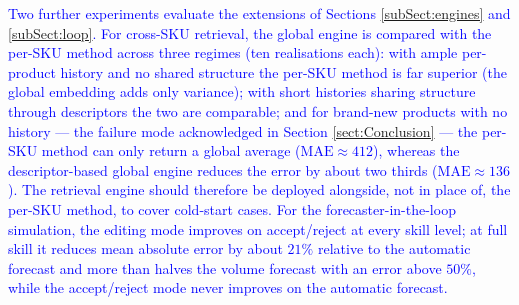 \documentclass{ieeeaccess}
\newcommand{\myblue}[1]{\textcolor{blue}{#1}}
\begin{document}
\begin{table}[t]
\centering
{}
\caption{\myblue{Ablation on the surrogate model of Section
\ref{subSect:muticol} (mean over the ideal, collinearity and endogeneity
scenarios, five realisations). Correcting the selection of $k$ alone removes a
large fraction of the error, and the metric-learning engines improve on it
further. The uniform-weight row isolates the contribution of metric learning.}}
\label{tab:revisedAblation}
\end{table}

\myblue{Two further experiments evaluate the extensions of
Sections \ref{subSect:engines} and \ref{subSect:loop}. For cross-SKU
retrieval, the global engine is compared with the per-SKU method across three
regimes (ten realisations each): with ample per-product history and no shared
structure the per-SKU method is far superior (the global embedding adds only
variance); with short histories sharing structure through descriptors the two
are comparable; and for brand-new products with no history --- the failure mode
acknowledged in Section \ref{sect:Conclusion} --- the per-SKU method can only
return a global average ($\mathrm{MAE}\approx412$), whereas the descriptor-based
global engine reduces the error by about two thirds ($\mathrm{MAE}\approx136$).
The retrieval engine should therefore be deployed alongside, not in place of,
the per-SKU method, to cover cold-start cases. For the forecaster-in-the-loop
simulation, the editing mode improves on accept/reject at every skill level; at
full skill it reduces mean absolute error by about $21\%$ relative to the
automatic forecast and more than halves the volume forecast with an error above
$50\%$, while the accept/reject mode never improves on the automatic forecast.}
\end{document}

